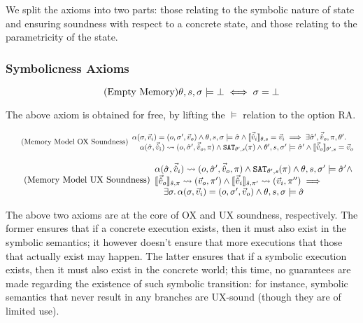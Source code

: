 We split the axioms into two parts: those relating to the symbolic nature of state and ensuring soundness with respect to a concrete state, and those relating to the parametricity of the state.

\subsubsection{Symbolicness Axioms}

\begin{equation}
\tag{Empty Memory}\label{eq:empty-mem}
\theta,s,\st\models \bot \iff \st = \bot
\end{equation}

The above axiom is obtained for free, by lifting the $\models$ relation to the option RA.

\begin{equation}
\tag{Memory Model OX Soundness}\label{eq:mem-ox-soundness}
\begin{array}{l}
\ppexecc{\alpha}{\st,\ins}{o,\st',\outs} \land \theta,s,\st\models\sst \land \expeval{\sins}=\ins \implies \exists \sst',\souts,\pc,\theta'\ldotp\\
\quad \ppexec{\alpha}{\sst,\sins}{o,\sst',\souts,\pc} \land \SAT[\theta',s](\pc) \land \theta',s,\st'\models \sst' \land  \expeval[\theta',s]{\souts}=\outs
\end{array}
\end{equation}

\begin{equation}
\tag{Memory Model UX Soundness}\label{eq:mem-ux-soundness}
\begin{array}{l}
\ppexec{\alpha}{\sst,\sins}{o,\sst',\souts,\pc} \land \SAT[\theta',s](\pc) \land \theta,s,\st'\models\sst' \land \\
\expeval[\sym s,\pc]{\souts}\rightsquigarrow(\outs,\pc')\land \expeval[\sym s,\pc']{\sins}\rightsquigarrow(\ins,\pc'')\implies\\
\quad \exists \st\ldotp \ppexecc{\alpha}{\st,\ins}{o,\st',\outs} \land \theta,s,\st\models\sst
\end{array}
\end{equation}

The above two axioms are at the core of OX and UX soundness, respectively. The former ensures that if a concrete execution exists, then it must also exist in the symbolic semantics; it however doesn't ensure that more executions that those that actually exist may happen. The latter ensures that if a symbolic execution exists, then it must also exist in the concrete world; this time, no guarantees are made regarding the existence of such symbolic transition: for instance, symbolic semantics that never result in any branches are UX-sound (though they are of limited use).

